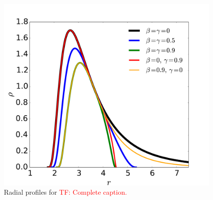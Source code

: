 \documentclass{aa}
\newcommand{\tf}[1]{\textcolor{red}{TF: #1}}
\begin{document}
 \begin{figure}[h!]
\centering
\includegraphics[scale=0.25]{figures/fig5.pdf}
\caption{Radial profiles for \tf{Complete caption.}}
           \label{more-profile}%
 \end{figure}
 
\end{document}
